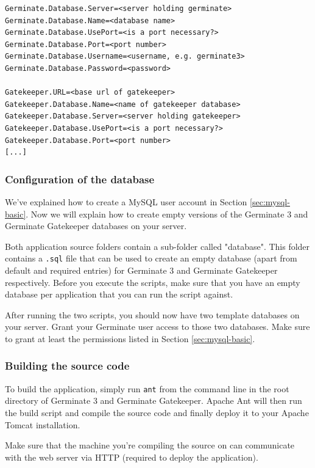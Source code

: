 \begin{lstlisting}[style=Properties]
Germinate.Database.Server=<server holding germinate>
Germinate.Database.Name=<database name>
Germinate.Database.UsePort=<is a port necessary?>
Germinate.Database.Port=<port number>
Germinate.Database.Username=<username, e.g. germinate3>
Germinate.Database.Password=<password>

Gatekeeper.URL=<base url of gatekeeper>
Gatekeeper.Database.Name=<name of gatekeeper database>
Gatekeeper.Database.Server=<server holding gatekeeper>
Gatekeeper.Database.UsePort=<is a port necessary?>
Gatekeeper.Database.Port=<port number>
[...]
\end{lstlisting}

\subsubsection{Configuration of the database}

We've explained how to create a MySQL user account in Section \ref{sec:mysql-basic}. Now we will explain how to create empty versions of the Germinate 3 and Germinate Gatekeeper databases on your server.

Both application source folders contain a sub-folder called "database". This folder contains a \texttt{.sql} file that can be used to create an empty database (apart from default and required entries) for Germinate 3 and Germinate Gatekeeper respectively. Before you execute the scripts, make sure that you have an empty database per application that you can run the script against.

After running the two scripts, you should now have two template databases on your server. Grant your Germinate user access to those two databases. Make sure to grant at least the permissions listed in Section \ref{sec:mysql-basic}.

\subsubsection{Building the source code}
To build the application, simply run \texttt{ant} from the command line in the root directory of Germinate 3 and Germinate Gatekeeper. Apache Ant will then run the build script and compile the source code and finally deploy it to your Apache Tomcat installation.

Make sure that the machine you're compiling the source on can communicate with the web server via HTTP (required to deploy the application).

